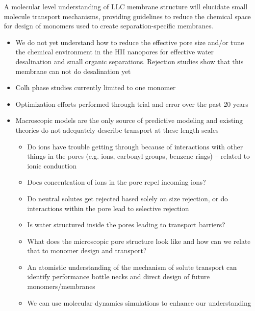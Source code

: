 \documentclass{article}
\begin{document}
	A molecular level understanding of LLC membrane structure will elucidate small molecule transport mechanisms, providing guidelines to reduce the chemical space for design of monomers used to create separation-specific membranes.
	\begin{itemize}
                \item We do not yet understand how to reduce the effective pore size and/or tune the chemical environment in the HII nanopores for effective water desalination and small organic separations. Rejection studies show that this membrane can not do desalination yet
		\item Colh phase studies currently limited to one monomer
                \item Optimization efforts performed through trial and error over the past 20 years
                \item Macroscopic models are the only source of predictive modeling and existing theories do not adequately describe transport at these length scales
                \begin{itemize}
                        \item Do ions have trouble getting through because of interactions with other things in the pores (e.g. ions, carbonyl groups, benzene rings) -- related to ionic conduction
                        \item Does concentration of ions in the pore repel incoming ions?
                        \item Do neutral solutes get rejected based solely on size rejection, or do interactions within the pore lead to selective rejection
                        \item Is water structured inside the pores leading to transport barriers?
			\item What does the microscopic pore structure look like and how can we relate that to monomer design and transport?
		\item An atomistic understanding of the mechanism of solute transport can identify performance bottle necks and direct design of future monomers/membranes
		\item We can use molecular dynamics simulations to enhance our understanding 
	\end{itemize}
	 

\end{itemize}
\end{document}
